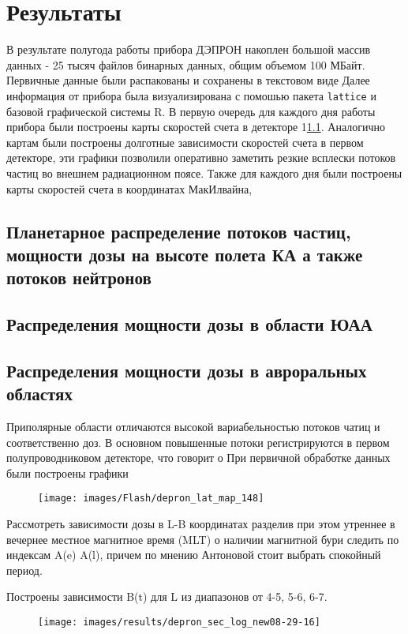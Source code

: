 
\chapter{Результаты}\label{chapt_results}
В результате полугода работы прибора ДЭПРОН накоплен большой массив данных - 25 тысяч файлов бинарных данных, общим объемом 100 МБайт. Первичные данные были распакованы и сохранены в текстовом виде 
Далее информация от прибора была визуализирована с помошью пакета \texttt{lattice} и базовой графической системы R. 
В первую очередь для каждого дня работы прибора были построены карты скоростей счета в детекторе 1\ref{sec:planetDose}. Аналогично картам были построены долготные зависимости скоростей счета в первом детекторе, эти графики позволили оперативно заметить резкие всплески потоков частиц во внешнем радиационном поясе. Также для каждого дня были построены карты скоростей счета в координатах МакИлвайна, 

\section{Планетарное распределение потоков частиц, мощности дозы на высоте полета КА а также потоков нейтронов} \label{sec:planetDose}


\section{Распределения мощности дозы в области ЮАА}

\section{Распределения мощности дозы в авроральных областях}
Приполярные области отличаются высокой вариабельностью потоков чатиц и соответственно доз. В основном повышенные потоки регистрируются в первом полупроводниковом детекторе, что говорит о 
При первичной обработке данных были построены графики 
\begin{figure}[h]
	\texttt{[image: images/Flash/depron\_lat\_map\_148]}
	\caption[Потокизаряженных частиц в детекторе 1]{}
	\caption{}
	\label{fig:depronlatmap148}
\end{figure}
Рассмотреть зависимости дозы в L-B координатах разделив при этом утреннее в вечернее местное магнитное время (MLT) о наличии магнитной бури следить по индексам A(e) A(l), причем по мнению Антоновой стоит выбрать спокойный период.

Построены зависимости B(t) для L из диапазонов от 4-5, 5-6, 6-7.
\begin{figure}
	\centering
	\texttt{[image: images/results/depron\_sec\_log\_new08-29-16]}
	\caption{}
	\label{fig:depronseclognew08-29-16}
\end{figure}

